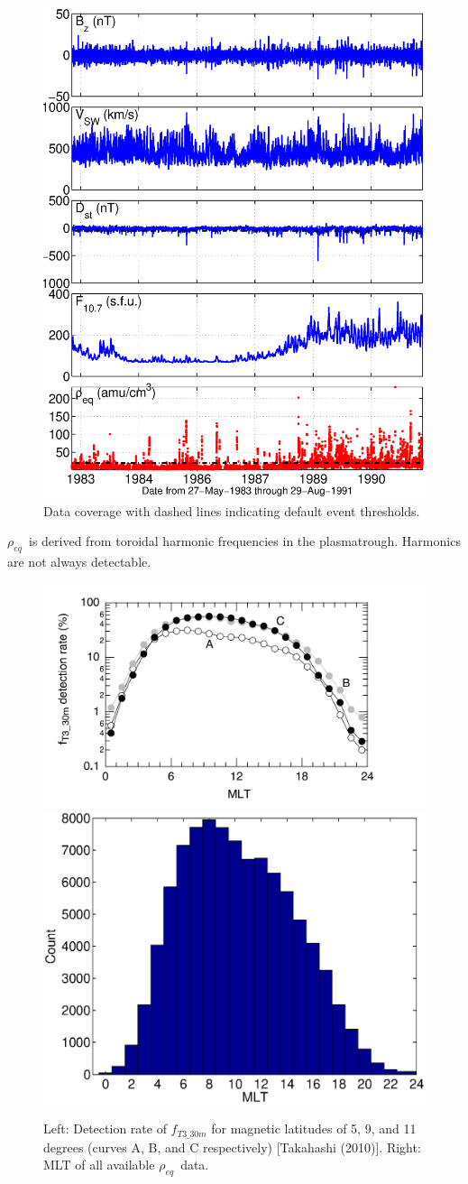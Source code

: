 \documentclass[xcolor={dvipsnames,table}]{beamer}
\newcommand{\req}{\ensuremath{\rho_{eq}}} %
\begin{document}
\begin{frame}
	\begin{figure}[htp!]
		\centering
		\includegraphics[width=0.5\linewidth]{Figures/alldata-GOES6-1983-1991}
		\caption{Data coverage with dashed lines indicating default event thresholds.}
		\label{fig:alldata-GOES6-1983-1991}
	\end{figure}
\end{frame}

\begin{frame}
	\req\ is derived from toroidal harmonic frequencies in the plasmatrough. Harmonics are not always detectable.
	\begin{figure}[htp!]
		\centering
		\includegraphics[width=0.4\linewidth]{Figures/Takahashi2010Availability.png}
		\includegraphics[width=0.4\linewidth]{Figures/databyMLT}
		\caption{Left: Detection rate of $f_{T3\_30m}$ for magnetic latitudes of 5, 9, and 11 degrees (curves A, B, and C respectively) [Takahashi (2010)]. Right: MLT of all available \req\ data.}
		\label{fig:Takahashi2010Availability}
	\end{figure}
\end{frame}
\end{document}
